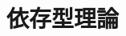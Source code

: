 \documentclass[index]{subfiles}
\begin{document}
\section{依存型理論}
\label{dependent-type-theory}

\begin{myShiftSections}
  
\end{myShiftSections}
\end{document}
